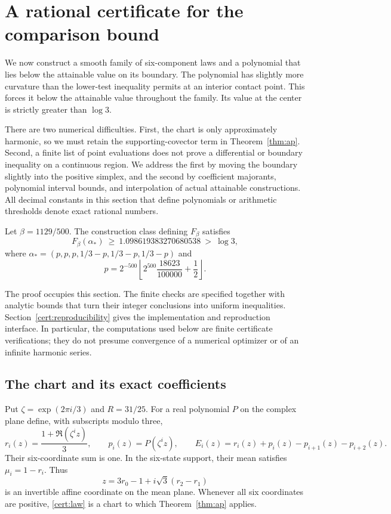 \section{A rational certificate for the comparison bound}
\label{cert:section}

We now construct a smooth family of six-component laws and a polynomial
that lies below the attainable value on its boundary.  The polynomial has
slightly more curvature than the lower-test inequality permits at an interior
contact point.  This forces it below the attainable value throughout the
family.  Its value at the center is strictly greater than $\log 3$.

There are two numerical difficulties.  First, the chart is only approximately
harmonic, so we must retain the supporting-covector term in
Theorem~\ref{thm:ap}.  Second, a finite list of point evaluations does not
prove a differential or boundary inequality on a continuous region.  We
address the first by moving the boundary slightly into the positive simplex,
and the second by coefficient majorants, polynomial interval bounds, and
interpolation of actual attainable constructions.  All decimal constants
in this section that define polynomials or arithmetic thresholds denote exact
rational numbers.

\begin{theorem}\label{thm:certificate}
Let $\beta=1129/500$.  The construction class defining $F_\beta$ satisfies
\[
 F_\beta(\alpha_*)\ \geq\ 1.098619383270680538
     \ >\ \log 3,
\]
where $\alpha_*=(p,p,p,1/3-p,1/3-p,1/3-p)$ and
\[
 p=2^{-500}\left\lfloor 2^{500}\frac{18623}{100000}
                                      +\frac12\right\rfloor.
\]
\end{theorem}

The proof occupies this section.  The finite checks are specified together
with analytic bounds that turn their integer conclusions into uniform
inequalities.  Section~\ref{cert:reproducibility} gives the implementation
and reproduction interface.  In particular, the computations used below are
finite certificate verifications; they do not presume convergence of a
numerical optimizer or of an infinite harmonic series.

\subsection{The chart and its exact coefficients}
\label{cert:chart}

Put $\zeta=\exp(2\pi i/3)$ and $R=31/25$.  For a real polynomial $P$ on the
complex plane define, with subscripts modulo three,
\begin{equation}\label{cert:law}
 r_i(z)=\frac{1+\Re(\zeta^i z)}3,\qquad
 p_i(z)=P(\zeta^i z),\qquad
 E_i(z)=r_i(z)+p_i(z)-p_{i+1}(z)-p_{i+2}(z).
\end{equation}
Their six-coordinate sum is one.  In the six-state support, their mean
satisfies $\mu_i=1-r_i$.  Thus
\[
 z=3r_0-1+i\sqrt3(r_2-r_1)
\]
is an invertible affine coordinate on the mean plane.  Whenever all six
coordinates are positive, \eqref{cert:law} is a chart to which
Theorem~\ref{thm:ap} applies.

